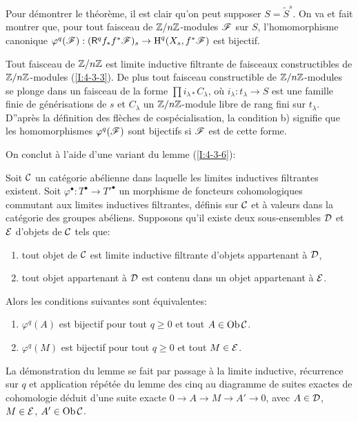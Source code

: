 \documentclass[oneside]{book}
\begin{document}
Pour démontrer le théorème, il est clair qu'on peut supposer 
$S=\widetilde S^s$. On va et fait montrer que, pour tout faisceau de 
$\mathbb{Z}/n\mathbb{Z}$-modules $\mathscr{F}$ sur $S$, l'homomorphisme canonique 
$\varphi^q(\mathscr{F}):(\mathsf{R}^q f_* f^* \mathscr{F})_s \to \operatorname{H}^q(X_s,f^*\mathscr{F})$ est bijectif. 

Tout faisceau de $\mathbb{Z}/n\mathbb{Z}$ est limite inductive filtrante de faisceaux 
constructibles de $\mathbb{Z}/n\mathbb{Z}$-modules (\ref{I:4-3-3}). De plus tout faisceau 
constructible de $\mathbb{Z}/n\mathbb{Z}$-modules se plonge dans un faisceau de la forme 
$\prod i_{\lambda *} C_\lambda$, où $i_\lambda:t_\lambda\to S$ est une 
famille finie de générisations de $s$ et $C_\lambda$ un $\mathbb{Z}/n\mathbb{Z}$-module 
libre de rang fini sur $t_\lambda$. D''après la définition des flèches de 
cospécialisation, la condition b) signifie que les homomorphismes 
$\varphi^q(\mathscr{F})$ sont bijectifs si $\mathscr{F}$ est de cette forme. 

On conclut à l'aide d'une variant du lemme (\ref{I:4-3-6}):





\begin{lemma}\label{I:5-1-8}
Soit $\mathcal{C}$ un catégorie abélienne dans laquelle les limites inductives 
filtrantes existent. Soit $\varphi^\bullet:T^\bullet\to{T'}^\bullet$ un 
morphisme de foncteurs cohomologiques commutant aux limites inductives 
filtrantes, définis sur $\mathcal{C}$ et à valeurs dans la catégorie des groupes 
abéliens. Supposons qu'il existe deux sous-ensembles $\mathcal{D}$ et $\mathcal{E}$ d'objets 
de $\mathcal{C}$ tels que:
\begin{enumerate}[\indent a)]
  \item tout objet de $\mathcal{C}$ est limite inductive filtrante d'objets appartenant 
    à $\mathcal{D}$, 
  \item tout objet appartenant à $\mathcal{D}$ est contenu dans un objet appartenant 
    à $\mathcal{E}$.
\end{enumerate}

Alors les conditions suivantes sont équivalentes: 
\begin{enumerate}[\indent (i)]
  \item $\varphi^q(A)$ est bijectif pour tout $q\geqslant 0$ et tout 
    $A\in\operatorname{Ob}\mathcal{C}$.
  \item $\varphi^q(M)$ est bijectif pour tout $q\geqslant 0$ et tout $M\in\mathcal{E}$. 
\end{enumerate}
\end{lemma}

La démonstration du lemme se fait par passage à la limite inductive, 
récurrence sur $q$ et application répétée du lemme des cinq au diagramme 
de suites exactes de cohomologie déduit d'une suite exacte 
$0\to A\to M\to A'\to 0$, avec $A\in\mathcal{D}$, $M\in\mathcal{E}$, $A'\in \operatorname{Ob}\mathcal{C}$. 
\end{document}
